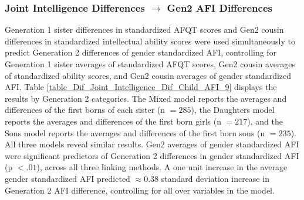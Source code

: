 \subsubsection{Joint Intelligence Differences $\rightarrow$ Gen2 AFI Differences}
Generation 1 sister differences in standardized AFQT scores and Gen2 cousin differences in standardized intellectual ability scores were used simultaneously to predict Generation 2 differences of gender standardized AFI, controlling for Generation 1 sister averages of standardized AFQT scores, Gen2 cousin averages of standardized ability scores, and Gen2 cousin averages of gender standardized AFI. Table \ref{table_Dif_Joint_Intelligence_Dif_Child_AFI_9} displays the results by Generation 2 categories. The Mixed model reports the averages and differences of the first borns of each sister (n $= 285$), the Daughters model reports the averages and differences of the first born girls (n $= 217$), and the Sons model reports the averages and differences of the first born sons (n $= 235$). All three models reveal similar results. Gen2 averages of gender standardized AFI were significant predictors of Generation 2 differences in gender standardized AFI (p $< .01$), across all three linking methods. A one unit increase in the average gender standardized AFI predicted $\approx 0.38$ standard deviation increase in Generation 2 AFI difference, controlling for all over variables in the model. 

